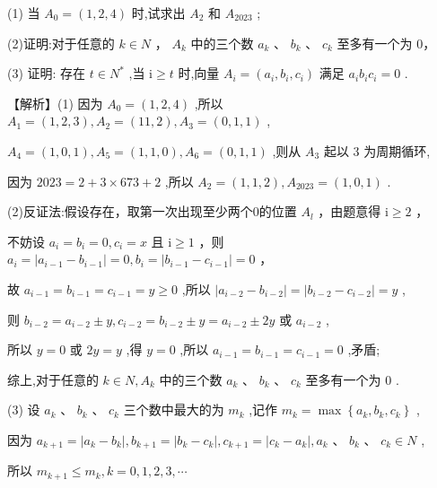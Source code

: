 \documentclass[10pt]{article}
\begin{document}
(1) 当 \({A}_{0} = \left( {1,2,4}\right)\) 时,试求出 \({A}_{2}\) 和 \({A}_{2023}\) ;

(2)证明:对于任意的 \(k \in  N\) ， \({A}_{k}\) 中的三个数 \({a}_{k}\) 、 \({b}_{k}\) 、 \({c}_{k}\) 至多有一个为 0，

(3) 证明: 存在 \(t \in  {N}^{ * }\) ,当 \(\mathrm{i} \geq  t\) 时,向量 \({A}_{i} = \left( {{a}_{i},{b}_{i},{c}_{i}}\right)\) 满足 \({a}_{i}{b}_{i}{c}_{i} = 0\) .

【解析】(1) 因为 \({A}_{0} = \left( {1,2,4}\right)\) ,所以 \({A}_{1} = \left( {1,2,3}\right) ,{A}_{2} = \left( {{11},2}\right) ,{A}_{3} = \left( {0,1,1}\right)\) ,

\({A}_{4} = \left( {1,0,1}\right) ,{A}_{5} = \left( {1,1,0}\right) ,{A}_{6} = \left( {0,1,1}\right)\) ,则从 \({A}_{3}\) 起以 3 为周期循环,

因为 \({2023} = 2 + 3 \times  {673} + 2\) ,所以 \({A}_{2} = \left( {1,1,2}\right) ,{A}_{2023} = \left( {1,0,1}\right)\) .

(2)反证法:假设存在，取第一次出现至少两个0的位置 \({A}_{l}\) ，由题意得 \(\mathrm{i} \geq  2\) ，

不妨设 \({a}_{i} = {b}_{i} = 0,{c}_{i} = x\) 且 \(\mathrm{i} \geq  1\) ，则 \({a}_{i} = \left| {{a}_{i - 1} - {b}_{i - 1}}\right|  = 0,{b}_{i} = \left| {{b}_{i - 1} - {c}_{i - 1}}\right|  = 0\) ，

故 \({a}_{i - 1} = {b}_{i - 1} = {c}_{i - 1} = y \geq  0\) ,所以 \(\left| {{a}_{i - 2} - {b}_{i - 2}}\right|  = \left| {{b}_{i - 2} - {c}_{i - 2}}\right|  = y\) ,

则 \({b}_{i - 2} = {a}_{i - 2} \pm  y,{c}_{i - 2} = {b}_{i - 2} \pm  y = {a}_{i - 2} \pm  {2y}\) 或 \({a}_{i - 2}\) ,

所以 \(y = 0\) 或 \({2y} = y\) ,得 \(y = 0\) ,所以 \({a}_{i - 1} = {b}_{i - 1} = {c}_{i - 1} = 0\) ,矛盾;

综上,对于任意的 \(k \in  N,{A}_{k}\) 中的三个数 \({a}_{k}\text{ 、 }{b}_{k}\text{ 、 }{c}_{k}\) 至多有一个为 0 .

(3) 设 \({a}_{k}\text{ 、 }{b}_{k}\text{ 、 }{c}_{k}\) 三个数中最大的为 \({m}_{k}\) ,记作 \({m}_{k} = \max \left\{  {{a}_{k},{b}_{k},{c}_{k}}\right\}\) ,

因为 \({a}_{k + 1} = \left| {{a}_{k} - {b}_{k}}\right| ,{b}_{k + 1} = \left| {{b}_{k} - {c}_{k}}\right| ,{c}_{k + 1} = \left| {{c}_{k} - {a}_{k}}\right| ,{a}_{k}\text{ 、 }{b}_{k}\text{ 、 }{c}_{k} \in  N\) ,

所以 \({m}_{k + 1} \leq  {m}_{k},k = 0,1,2,3,\cdots\)
\end{document}
